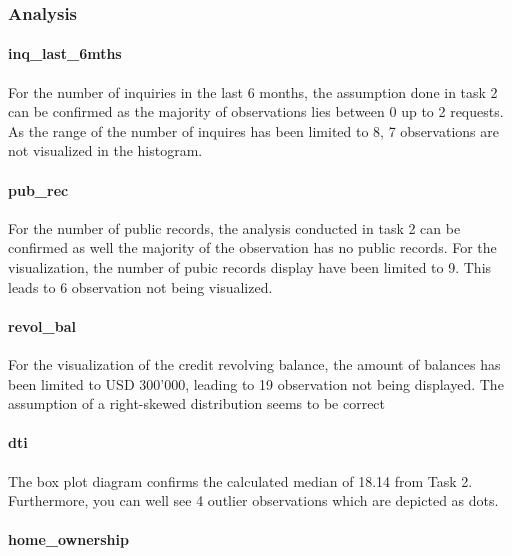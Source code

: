 \documentclass[
  letterpaper,
  DIV=11,
  numbers=noendperiod]{scrartcl}
\let\oldparagraph\paragraph
\renewcommand{\paragraph}[1]{\oldparagraph{#1}\mbox{}}
\begin{document}
\hypertarget{analysis-1}{%
\subsubsection{Analysis}\label{analysis-1}}

\hypertarget{inq_last_6mths-1}{%
\paragraph{inq\_last\_6mths}\label{inq_last_6mths-1}}

For the number of inquiries in the last 6 months, the assumption done in
task 2 can be confirmed as the majority of observations lies between 0
up to 2 requests. As the range of the number of inquires has been
limited to 8, 7 observations are not visualized in the histogram.

\hypertarget{pub_rec-1}{%
\paragraph{pub\_rec}\label{pub_rec-1}}

For the number of public records, the analysis conducted in task 2 can
be confirmed as well the majority of the observation has no public
records. For the visualization, the number of pubic records display have
been limited to 9. This leads to 6 observation not being visualized.

\hypertarget{revol_bal-1}{%
\paragraph{revol\_bal}\label{revol_bal-1}}

For the visualization of the credit revolving balance, the amount of
balances has been limited to USD 300'000, leading to 19 observation not
being displayed. The assumption of a right-skewed distribution seems to
be correct

\hypertarget{dti-1}{%
\paragraph{dti}\label{dti-1}}

The box plot diagram confirms the calculated median of 18.14 from Task
2. Furthermore, you can well see 4 outlier observations which are
depicted as dots.

\hypertarget{home_ownership-1}{%
\paragraph{home\_ownership}\label{home_ownership-1}}
\end{document}
